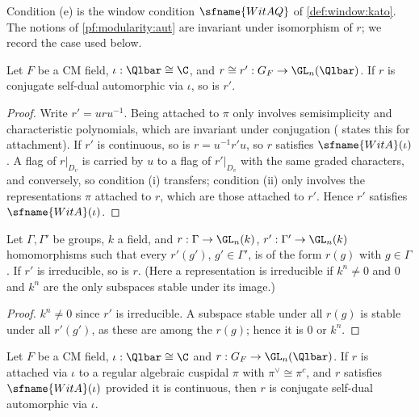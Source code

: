 Condition (e) is the window condition $\sfname{WitAQ}$ of \cref{def:window:kato}. The notions of
\cref{pf:modularity:aut} are invariant under isomorphism of $r$; we record the case used below.

\begin{lemma}\label{pf:modularity:iso}
Let $F$ be a CM field, $\iota:\Qlbar\cong\C$, and $r\cong r':G_F\to\GL_n(\Qlbar)$. If $r$ is conjugate self-dual
automorphic via $\iota$, so is $r'$.
\end{lemma}

\begin{proof}
Write $r'=uru^{-1}$. Being attached to $\pi$ only involves semisimplicity and characteristic polynomials, which are
invariant under conjugation ( states this for attachment). If $r'$ is
continuous, so is $r=u^{-1}r'u$, so $r$ satisfies $\sfname{WitA}(\iota)$. A flag of $r|_{D_v}$ is carried by $u$ to a
flag of $r'|_{D_v}$ with the same graded characters, and conversely, so condition (i) transfers; condition (ii) only
involves the representations $\pi$ attached to $r$, which are those attached to $r'$. Hence $r'$ satisfies
$\sfname{WitA}(\iota)$.
\end{proof}

\begin{lemma}\label{pf:modularity:isirr}
Let $\Gamma,\Gamma'$ be groups, $k$ a field, and $r:\Gamma\to\GL_n(k)$, $r':\Gamma'\to\GL_n(k)$ homomorphisms such that
every $r'(g')$, $g'\in\Gamma'$, is of the form $r(g)$ with $g\in\Gamma$. If $r'$ is irreducible, so is $r$. (Here a
representation is irreducible if $k^n\ne0$ and $0$ and $k^n$ are the only subspaces stable under its image.)
\end{lemma}

\begin{proof}
$k^n\ne0$ since $r'$ is irreducible. A subspace stable under all $r(g)$ is stable under all $r'(g')$, as these are among
the $r(g)$; hence it is $0$ or $k^n$.
\end{proof}

\begin{lemma}\label{pf:modularity:mkcsd}
Let $F$ be a CM field, $\iota:\Qlbar\cong\C$ and $r:G_F\to\GL_n(\Qlbar)$. If $r$ is attached via $\iota$ to a regular
algebraic cuspidal $\pi$ with $\pi^\vee\cong\pi^c$, and $r$ satisfies $\sfname{WitA}(\iota)$ provided it is continuous,
then $r$ is conjugate self-dual automorphic via $\iota$.
\end{lemma}

